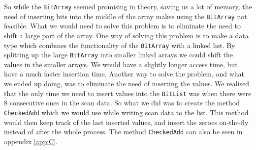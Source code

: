 So while the \lstinline|BitArray| seemed promising in theory, saving us a lot of memory, the need of inserting bits into the middle of the array makes using the \lstinline|BitArray| not feasible.
What we would need to solve this problem is to eliminate the need to shift a large part of the array. 
One way of solving this problem is to make a data type which combines the functionality of the \lstinline|BitArray| with a linked list. 
By splitting up the large \lstinline|BitArray| into smaller linked arrays we could shift the values in the smaller arrays. 
We would have a slightly longer access time, but have a much faster insertion time. 
Another way to solve the problem, and what we ended up doing, was to eliminate the need of inserting the values. 
We realised that the only time we need to insert values into the \lstinline|BitList| was when there were 8 consecutive ones in the scan data. 
So what we did was to create the method \lstinline|CheckedAdd| which we would use while writing scan data to the list. 
This method would then keep track of the last inserted values, and insert the zeroes on-the-fly instead of after the whole process. 
The method \lstinline|CheckedAdd| can also be seen in appendix \ref{app:C}.